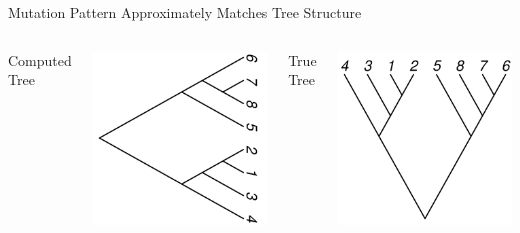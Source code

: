 \documentclass{beamer}
\begin{document}

\begin{frame}{Mutation Pattern Approximately Matches Tree Structure}
\begin{columns}
	\begin{center}
	Computed Tree
	\end{center}
	\includegraphics[width=\linewidth]{gatk_tree_rightwards.pdf}
	\begin{center}
	True Tree
	\end{center}
	\includegraphics[width=\linewidth,angle=90]{true_tree.pdf}
\end{columns}
\end{frame}
\end{document}
